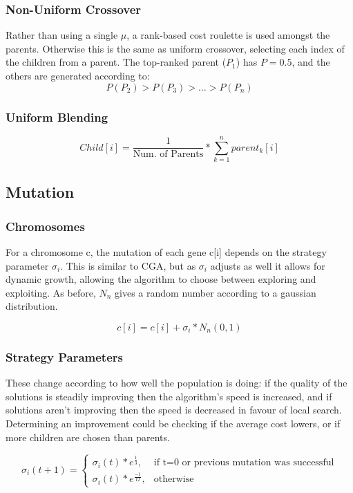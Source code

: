 \subsubsection{Non-Uniform Crossover}
Rather than using a single $\mu$, a rank-based cost roulette is used amongst the parents. Otherwise this is the same as uniform crossover, selecting each index of the children from a parent. The top-ranked parent ($P_1$) has $P = 0.5$, and the others are generated according to: 
\[
P(P_2) > P(P_3) > \dotso > P(P_n)
\]


\subsubsection{Uniform Blending}
\[
Child[i] = \frac{1}{\text{Num. of Parents}} * \sum_{k=1}^{n} parent_k[i]
\]

\subsection{Mutation}
\subsubsection{Chromosomes}
For a chromosome c, the mutation of each gene c[i] depends on the strategy parameter $\sigma_i$. This is similar to CGA, but as $\sigma_i$ adjusts as well it allows for dynamic growth, allowing the algorithm to choose between exploring and exploiting. As before, $N_n$ gives a random number according to a gaussian distribution.

\begin{equation}
    c[i] = c[i] + \sigma_i * N_n(0,1)
\end{equation}

\subsubsection{Strategy Parameters}
These change according to how well the population is doing: if the quality of the solutions is steadily improving then the algorithm's speed is increased, and if solutions aren't improving then the speed is decreased in favour of local search. Determining an improvement could be checking if the average cost lowers, or if more children are chosen than parents.

\begin{equation}
    \sigma_i(t+1) = 
    \begin{cases}
    \sigma_i(t) * e^{\frac{1}{3}}, & \text{if t=0 or previous mutation was successful} \\
    \sigma_i(t) * e^{\frac{-1}{12}}, & \text{otherwise}
    \end{cases}
\end{equation}

